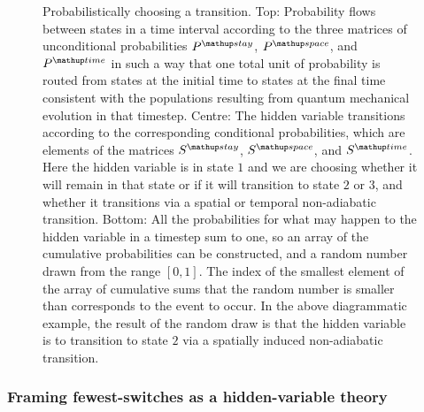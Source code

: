 \begin{figure}[t]
    \caption{Probabilistically choosing a transition. Top: Probability flows between states in a time interval according to the three matrices of unconditional probabilities $P^\up{stay}$, $P^\up{space}$, and $P^\up{time}$ in such a way that one total unit of probability is routed from states at the initial time to states at the final time consistent with the populations resulting from quantum mechanical evolution in that timestep. Centre: The hidden variable transitions according to the corresponding conditional probabilities, which are elements of the matrices $S^\up{stay}$, $S^\up{space}$, and $S^\up{time}$. Here the hidden variable is in state $1$ and we are choosing whether it will remain in that state or if it will transition to state $2$ or $3$, and whether it transitions via a spatial or temporal non-adiabatic transition. Bottom: All the probabilities for what may happen to the hidden variable in a timestep sum to one, so an array of the cumulative probabilities can be constructed, and a random number drawn from the range $[0,1]$. The index of the smallest element of the array of cumulative sums that the random number is smaller than corresponds to the event to occur. In the above diagrammatic example, the result of the random draw is that the hidden variable is to transition to state $2$ via a spatially induced non-adiabatic transition.}\label{fig:random_choice}
\end{figure}

\subsubsection{Framing fewest-switches as a hidden-variable theory}

